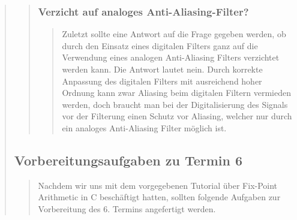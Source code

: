 \begin{quote}
\begin{quote}
\begin{quote}
		  \end{quote}
		  
		  \subsubsection{Verzicht auf analoges Anti-Aliasing-Filter?}
		  \begin{quote}
		  
    		  Zuletzt sollte eine Antwort auf die Frage gegeben werden, ob durch den
    		  Einsatz eines digitalen Filters ganz auf die Verwendung eines analogen
    		  Anti-Aliasing Filters verzichtet werden kann. Die Antwort lautet nein. Durch
    		  korrekte Anpassung des digitalen Filters mit ausreichend hoher Ordnung kann zwar 
    		  Aliasing beim digitalen Filtern vermieden werden, doch braucht man bei der
    		  Digitalisierung des Signals vor der Filterung einen Schutz vor Aliasing,
    		  welcher nur durch ein analoges Anti-Aliasing Filter möglich ist.
		  
		  \end{quote}
	
	\end{quote}%
	
	
    \subsection{Vorbereitungsaufgaben zu Termin 6}
    \begin{quote}
    	
    	Nachdem wir uns mit dem vorgegebenen Tutorial über Fix-Point Arithmetic in
    	C beschäftigt hatten, sollten folgende Aufgaben zur Vorbereitung des 6.
    	Termins angefertigt werden.
    	

\end{quote}
\end{quote}
